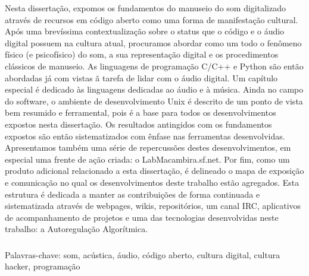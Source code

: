 \begin{resumo}

Nesta dissertação, expomos os fundamentos do manuseio do som digitalizado através de recursos em código aberto como
uma forma de manifestação cultural.
Após uma brevíssima contextualização sobre o status que o código e o áudio digital possuem na cultura atual, procuramos abordar como um todo o fenômeno
físico (e psicofísico) do som, a sua representação digital e os procedimentos clássicos de manuseio. As linguagens de programação C/C++ e Python
são então abordadas já com vistas ã tarefa de lidar com o áudio digital. Um capítulo especial é dedicado às linguagens dedicadas ao áudio e à música. Ainda no campo do software,
o ambiente de desenvolvimento Unix é descrito de um ponto
de vista bem resumido e ferramental, pois é a base para todos os desenvolvimentos expostos nesta dissertação.
Os resultados antingidos com os fundamentos expostos são então sistematizados com ênfase nas ferramentas desenvolvidas.
Apresentamos também uma série de repercussões destes desenvolvimentos, em especial uma frente de ação criada: o LabMacambira.sf.net.
Por fim, como um produto adicional relacionado a esta dissertação, é delineado o mapa de exposição e comunicação no qual
os desenvolvimentos deste trabalho estão agregados. Esta estrutura é dedicada a manter as contribuições
de forma continuada e sistematizada através de webpages, wikis, repositórios, um canal IRC, aplicativos de acompanhamento de projetos
e uma das tecnologias desenvolvidas neste trabalho: a Autoregulação Algorítmica.


$\phantom{linha em branco}$\\
Palavras-chave: som, acústica, áudio, código aberto, cultura digital, cultura hacker, programação

\end{resumo}

